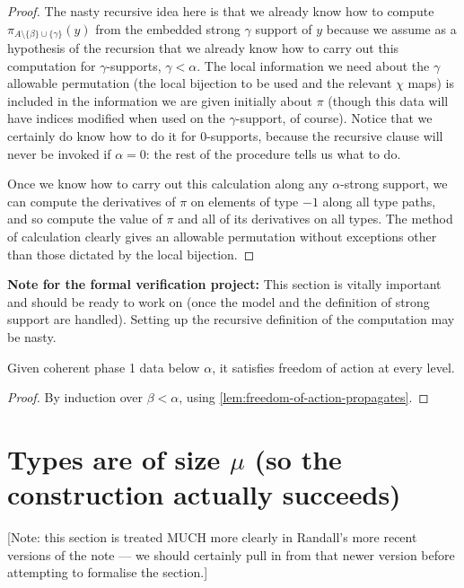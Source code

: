 \begin{proof}
The nasty recursive idea here is that we already know how to compute $\pi_{A \setminus \{\beta\} \cup \{\gamma\}}(y)$ from the embedded strong $\gamma$ support of $y$ because we assume as a hypothesis of the recursion that we already know how to carry out this computation for $\gamma$-supports, $\gamma<\alpha$.  The  local information we need about the $\gamma$ allowable permutation (the local bijection to be used and the relevant $\chi$ maps) is included in the information we are given initially about $\pi$ (though this data will have indices modified when used on the $\gamma$-support, of course).  Notice that we certainly do know how to do it for 0-supports, because the recursive clause will never be invoked if $\alpha=0$:  the rest of the procedure tells us what to do.

Once we know how to carry out this calculation along any $\alpha$-strong support, we can compute the derivatives of $\pi$ on elements of type $-1$  along all type paths, and so compute the value of $\pi$ and all of its derivatives on all types.  The method of calculation clearly gives an allowable permutation without exceptions other than those dictated by the local bijection.
\end{proof}

{\bf Note for the formal verification project:}  This section is vitally important and should be ready to work on (once the model and the definition of strong support are handled).  Setting up the recursive definition of the computation may be nasty.

\begin{theorem}
  \label{thm:freedom-of-action}
  Given coherent phase 1 data below $\alpha$, it satisfies freedom of action at every level.
\end{theorem}

\begin{proof}
  By induction over $\beta < \alpha$, using \cref{lem:freedom-of-action-propagates}.
\end{proof}


\newpage
\section{Types are of size \texorpdfstring{$\mu$}{μ} (so the construction actually succeeds)}

[Note: this section is treated MUCH more clearly in Randall’s more recent versions of the note — we should certainly pull in from that newer version before attempting to formalise the section.]


